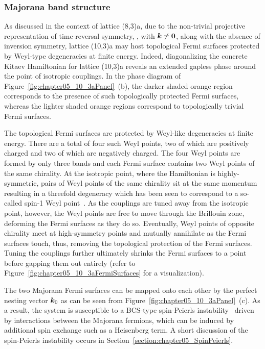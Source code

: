 \subsubsection{Majorana band structure}
%
%
As discussed in the context of lattice (8,3)a, due to the non-trivial projective representation of time-reversal symmetry, \ie, with $\bm{k} \neq \bm{0}$, along with the absence of inversion symmetry, lattice (10,3)a may host topological Fermi surfaces protected by Weyl-type degeneracies at finite energy.
Indeed, diagonalizing the concrete Kitaev Hamiltonian for lattice (10,3)a reveals an extended gapless phase around the point of isotropic couplings.
In the phase diagram of Figure~\ref{fig:chapter05_10_3aPanel}~(b), the darker shaded orange region corresponds to the presence of such topologically protected Fermi surfaces, whereas the lighter shaded orange regions correspond to topologically trivial Fermi surfaces.

The topological Fermi surfaces are protected by Weyl-like degeneracies at finite energy.
There are a total of four such Weyl points, two of which are positively charged and two of which are negatively charged.
The four Weyl points are formed by only three bands and each Fermi surface contains two Weyl points of the same chirality.
At the isotropic point, where the Hamiltonian is highly-symmetric, pairs of Weyl points of the same chirality sit at the same momentum resulting in a threefold degeneracy which has been seen to correspond to a so-called spin-1 Weyl point~\cite{WawrzikPRB2018}.
As the couplings are tuned away from the isotropic point, however, the Weyl points are free to move through the Brillouin zone, deforming the Fermi surfaces as they do so.
Eventually, Weyl points of opposite chirality meet at high-symmetry points and mutually annihilate as the Fermi surfaces touch, thus, removing the topological protection of the Fermi surfaces.
Tuning the couplings further ultimately shrinks the Fermi surfaces to a point before gapping them out entirely (refer to Figure~\ref{fig:chapter05_10_3aFermiSurfaces} for a visualization).

The two Majorana Fermi surfaces can be mapped onto each other by the perfect nesting vector $\bm{k}_0$ as can be seen from Figure~\ref{fig:chapter05_10_3aPanel}~(c).
As a result, the system is susceptible to a BCS-type spin-Peierls instability~\cite{HermannsPRL2015b} driven by interactions between the Majorana fermions, which can be induced by additional spin exchange such as a Heisenberg term.
A short discussion of the spin-Peierls instability occurs in Section~\ref{section:chapter05_SpinPeierls}.

